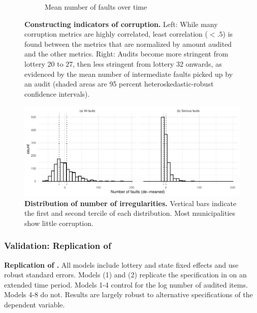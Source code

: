 \documentclass[12pt,a4paper]{article}
\theoremstyle{definition}
\begin{document}
{\begin{figure}[H]
\begin{subfigure}[b]{0.49\textwidth}
         \caption{Mean number of faults over time}
         \label{fig:corruptionOverTime}
     \end{subfigure}
    \caption{{\bf Constructing indicators of corruption.} Left: While many corruption metrics are highly correlated, least correlation ($< .5$) is found between the metrics that are normalized by amount audited and the other metrics. Right: Audits become more stringent from lottery 20 to 27, then less stringent from lottery 32 onwards, as evidenced by the mean number of intermediate faults picked up by an audit (shaded areas are 95 percent heteroskedastic-robust confidence intervals).}
    \label{fig:auditsOverTime}
\end{figure}

\begin{figure}[H]
    \centering
    \includegraphics{figures/distribNIrregularities}
    \caption{{\bf Distribution of number of irregularities.} Vertical bars indicate the first and second tercile of each distribution. Most municipalities show little corruption.}
    \label{fig:distribIrregularities}
\end{figure}

\begin{landscape}
    \subsubsection*{Validation: Replication of \citet{avis_government_2018}}
    \label{app:replication}

    \begin{table}[H]
        \centering
        \footnotesize
        
        \caption{{\bf Replication of \citet{avis_government_2018}.} All models include lottery and state fixed effects and use robust standard errors. Models (1) and (2) replicate the specification in \citet{avis_government_2018} on an extended time period. Models 1-4 control for the log number of audited items. Models 4-8 do not. Results are largely robust to alternative specifications of the dependent variable.}
        \label{tbl:replication}
    \end{table}    
\end{landscape}

}
\end{document}
